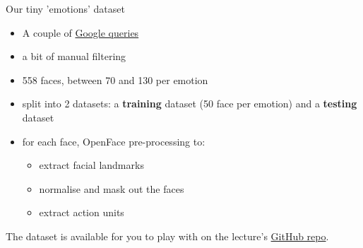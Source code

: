 \documentclass[compress]{beamer}
\begin{document}

\begin{frame}{Our tiny 'emotions' dataset}
    \begin{itemize}
        \item A couple of \href{https://www.google.co.uk/search?q=human+face+happiness&tbm=isch&source=lnt&tbs=itp:face}{Google queries}
        \item a bit of manual filtering
        \item 558 faces, between 70 and 130 per emotion
        \item split into 2 datasets: a {\bf training} dataset (50 face per
            emotion) and a {\bf testing} dataset
        \item for each face, OpenFace pre-processing to:
            \begin{itemize}
                \item extract facial landmarks
                \item normalise and mask out the faces
                \item extract action units
            \end{itemize}
    \end{itemize}

    The dataset is available for you to play with on the lecture's
    \href{https://github.com/severin-lemaignan/lecture-hri-emotions}{GitHub repo}.
\end{frame}
\end{document}
